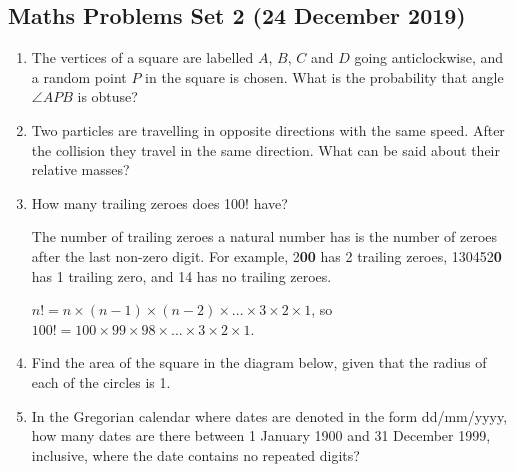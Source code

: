 \documentclass{article}
\begin{document}
\begin{center}
    \section*{Maths Problems Set 2 (24 December 2019)}
\end{center}

\begin{enumerate}
    \item
    The vertices of a square are labelled $A$, $B$, $C$ and $D$ going anticlockwise, and a random point $P$ in the square is chosen. What is the probability that angle $\angle{APB}$ is obtuse?
    
    \item
    Two particles are travelling in opposite directions with the same speed. After the collision they travel in the same direction. What can be said about their relative masses?
    
    \item
    How many trailing zeroes does 100! have?
    
    The number of trailing zeroes a natural number has is the number of zeroes after the last non-zero digit. For example, 2\textbf{00} has 2 trailing zeroes, 130452\textbf{0} has 1 trailing zero, and 14 has no trailing zeroes.
    
    $n! = n \times (n - 1) \times (n - 2) \times ... \times 3 \times 2 \times 1$, so $100! = 100 \times 99 \times 98 \times ... \times 3 \times 2 \times 1$.
    
    \item
    
    Find the area of the square in the diagram below, given that the radius of each of the circles is 1.
    
    
    \item
    In the Gregorian calendar where dates are denoted in the form dd/mm/yyyy, how many dates are there between 1 January 1900 and 31 December 1999, inclusive, where the date contains no repeated digits?
    

\end{enumerate}
\end{document}
